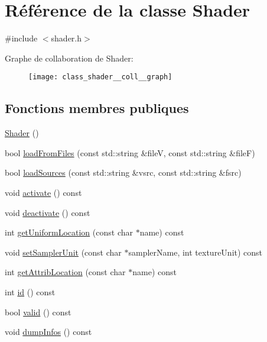 \hypertarget{class_shader}{}\section{Référence de la classe Shader}
\label{class_shader}


{\ttfamily \#include $<$shader.\+h$>$}



Graphe de collaboration de Shader\+:\nopagebreak
\begin{figure}[H]
\begin{center}
\leavevmode
\texttt{[image: class\_shader\_\_coll\_\_graph]}
\end{center}
\end{figure}
\subsection*{Fonctions membres publiques}
\begin{DoxyCompactItemize}
\item 
\hyperlink{class_shader_a0d654ebaca4e0555197c0724c6d30610}{Shader} ()
\item 
bool \hyperlink{class_shader_ab3326b4493672d0e456e05d9b64c7b28}{load\+From\+Files} (const std\+::string \&fileV, const std\+::string \&fileF)
\item 
bool \hyperlink{class_shader_ac849c6315a283ebf04571ca62000c187}{load\+Sources} (const std\+::string \&vsrc, const std\+::string \&fsrc)
\item 
void \hyperlink{class_shader_aac46b11981aef0616f45e191201f519a}{activate} () const
\item 
void \hyperlink{class_shader_ae7a6e4cdb7719dc501a61d6ef732ad98}{deactivate} () const
\item 
int \hyperlink{class_shader_ae42ef5734471e2cdf1e5045c8883961d}{get\+Uniform\+Location} (const char $\ast$name) const
\item 
void \hyperlink{class_shader_ae6ebc266e4706be4b040fe23aced651a}{set\+Sampler\+Unit} (const char $\ast$sampler\+Name, int texture\+Unit) const
\item 
int \hyperlink{class_shader_a4287e8012d956746f99cf8d1d6a126f8}{get\+Attrib\+Location} (const char $\ast$name) const
\item 
int \hyperlink{class_shader_ac6f8837bdac2997de1a79c9a518c664c}{id} () const
\item 
bool \hyperlink{class_shader_ade2fdfa75d4447eaac246b8d3b799cec}{valid} () const
\item 
void \hyperlink{class_shader_af4bd705b0eb25ec610dffb4b5d694641}{dump\+Infos} () const
\end{DoxyCompactItemize}
